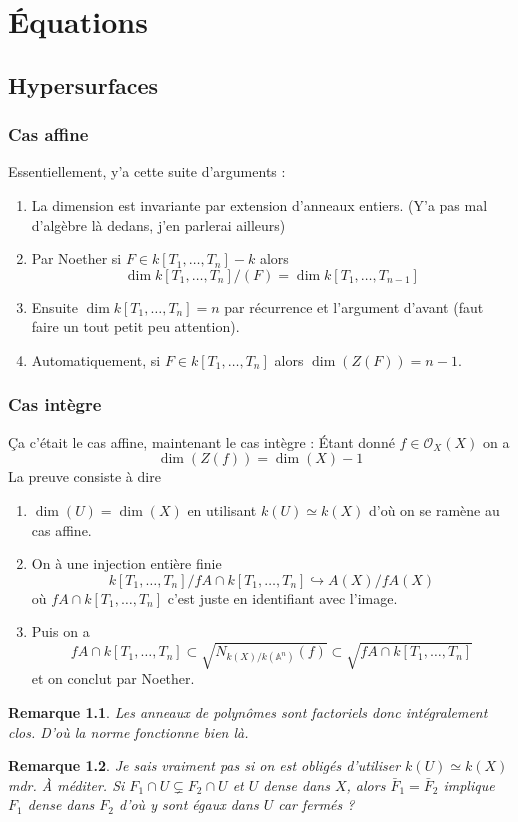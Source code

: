 \documentclass[a4paper,12pt]{book}
\newcommand{\A}{\mathbb{A}}
\newcommand{\Or}{\mathcal{O}}
\theoremstyle{plain}
\newtheorem{rem}{Remarque}
\theoremstyle{definition}
\theoremstyle{remark}
\begin{document}
\chapter{Équations}
\section{Hypersurfaces}
\subsection{Cas affine}
Essentiellement, y'a cette suite d'arguments :
\begin{enumerate}
    \item La dimension est invariante par extension d'anneaux entiers.
	(Y'a pas mal d'algèbre là dedans, j'en parlerai ailleurs)
    \item Par Noether si $F\in k[T_1,\ldots, T_n]-k$ alors 
	\[\dim k[T_1,\ldots, T_n]/(F)=\dim k[T_1,\ldots, T_{n-1}]\]
    \item Ensuite $\dim k[T_1,\ldots,T_n]=n$ par récurrence et 
	l'argument d'avant (faut faire un tout petit peu attention).
    \item Automatiquement, si $F\in k[T_1,\ldots, T_n]$ alors
	$\dim(Z(F))=n-1$.
\end{enumerate}
\subsection{Cas intègre}
Ça c'était le cas affine, maintenant le cas intègre : Étant donné
$f\in \Or_X(X)$ on a
\[\dim(Z(f))=\dim(X)-1\]
La preuve consiste à dire 
\begin{enumerate}
    \item $\dim(U)=\dim(X)$ en utilisant $k(U)\simeq k(X)$ d'où
	on se ramène au cas affine.
    \item On à une injection entière finie 
	\[k[T_1,\ldots, T_n]/fA\cap k[T_1,\ldots, T_n]\hookrightarrow
	A(X)/fA(X)\]
	où $fA\cap k[T_1,\ldots, T_n]$ c'est juste en identifiant avec
	l'image.
    \item Puis on a 
	\[fA\cap k[T_1,\ldots, T_n]\subset \sqrt{N_{k(X)/k(\A^n)}(f)}
	\subset \sqrt{fA\cap k[T_1,\ldots, T_n]}\]
    et on conclut par Noether.
\end{enumerate}
\begin{rem}
    Les anneaux de polynômes sont factoriels donc intégralement clos.
    D'où la norme fonctionne bien là.
\end{rem}
\begin{rem}
    Je sais vraiment pas si on est obligés d'utiliser $k(U)\simeq k(X)$
    mdr. À méditer. Si $F_1\cap U \subsetneq F_2\cap U$ et $U$ dense
    dans $X$, alors $\bar F_1 = \bar F_2$ implique $F_1$ dense dans 
    $F_2$ d'où y sont égaux dans $U$ car fermés ? 
\end{rem}
\end{document}
